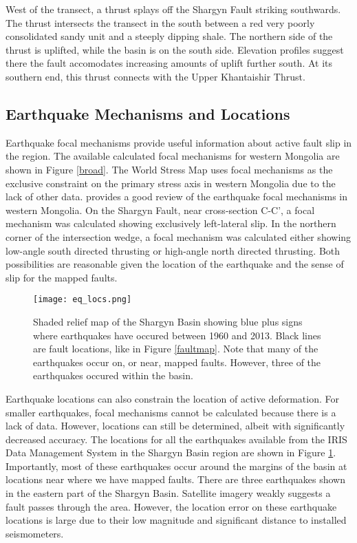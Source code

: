 West of the transect, a thrust splays off the Shargyn Fault striking southwards. The thrust intersects the transect in the south between a red very poorly consolidated sandy unit and a steeply dipping shale. The northern side of the thrust is uplifted, while the basin is on the south side. Elevation profiles suggest there the fault accomodates increasing amounts of uplift further south. At its southern end, this thrust connects with the Upper Khantaishir Thrust. 

\subsection{Earthquake Mechanisms and Locations}
	Earthquake focal mechanisms provide useful information about active fault slip in the region. The available calculated focal mechanisms for western Mongolia are shown in Figure \ref{broad}. The World Stress Map \citep{WorldStressMap2008} uses focal mechanisms as the exclusive constraint on the primary stress axis in western Mongolia due to the lack of other data. \citet{Bayasgalan2005a} provides a good review of the earthquake focal mechanisms in western Mongolia. On the Shargyn Fault, near cross-section C-C', a focal mechanism was calculated showing exclusively left-lateral slip. In the northern corner of the intersection wedge, a focal mechanism was calculated either showing low-angle south directed thrusting or high-angle north directed thrusting. Both possibilities are reasonable given the location of the earthquake and the sense of slip for the mapped faults.
\begin{figure}[p!]
  \centering
  \texttt{[image: eq\_locs.png]}
  \caption{Shaded relief map of the Shargyn Basin showing blue plus signs where earthquakes have occured between 1960 and 2013. Black lines are fault locations, like in Figure \ref{faultmap}. Note that many of the earthquakes occur on, or near, mapped faults. However, three of the earthquakes occured within the basin.}
  \label{eqlocs}
\end{figure}	

	Earthquake locations can also constrain the location of active deformation. For smaller earthquakes, focal mechanisms cannot be calculated because there is a lack of data. However, locations can still be determined, albeit with significantly decreased accuracy. The locations for all the earthquakes available from the IRIS Data Management System  in the Shargyn Basin region are shown in Figure \ref{eqlocs}. Importantly, most of these earthquakes occur around the margins of the basin at locations near where we have mapped faults. There are three earthquakes shown in the eastern part of the Shargyn Basin. Satellite imagery weakly suggests a fault passes through the area. However, the location error on these earthquake locations is large due to their low magnitude and significant distance to installed seismometers.

